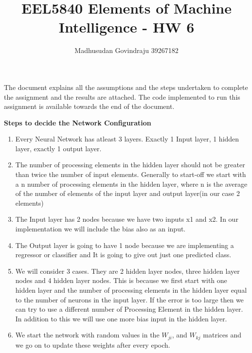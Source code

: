 \documentclass[10pt, letterpaper]{article}
\author{Madhusudan Govindraju 39267182 }
\date{}
\begin{document}
\title{EEL5840  Elements of Machine Intelligence - HW 6}
\maketitle

The document explains all the assumptions and the steps undertaken to complete the assignment and the results  are attached. The code implemented to run this assignment is available towards the end of the document.

\textbf{ Steps to decide the Network Configuration}
\begin{enumerate}
\item Every Neural Network has atleast 3 layers. Exactly 1 Input layer, 1 hidden layer, exactly 1 output layer. 
\item The number of processing elements in the hidden layer should not be greater than twice the number of input elements. Generally to start-off we start with a n number of processing elements in the hidden layer, where n is the average of the number of elements of the input layer and output layer(in our case 2 elements)
\item The Input layer has 2 nodes because we have two inputs x1 and x2. In our implementation we will include the bias also as an input. 
\item The Output layer is going to have 1 node because we are implementing a regressor or classifier and It is going to give out just one predicted class.
\item We will consider 3 cases. They are 2 hidden layer nodes, three hidden layer nodes and 4 hidden layer nodes. This is because we first start with one hidden layer and the number of processing elements in the hidden layer equal to the number of neurons in the input layer. If the error is too large then we can try to use a different number of Processing Element in the hidden layer. In addition to this we will use one more bias input in the hidden layer.
\item We start the network with random values in the $W_{ji}$, and $W_{kj}$ matrices and we go on to update these weights after every epoch.
\end{enumerate}
\end{document}
